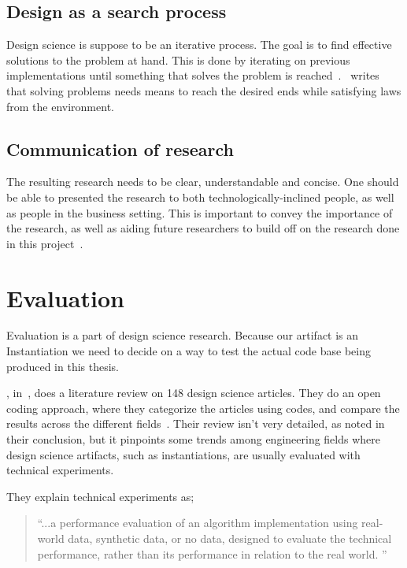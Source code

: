 \documentclass[../Main/thesis.tex]{subfiles}
\begin{document}
\subsection*{Design as a search process}%
\label{sub:design_as_a_search_process}
Design science is suppose to be an iterative process. The goal is to find
effective solutions to the problem at hand. This is done by iterating on
previous implementations until something that solves the problem is
reached~\cite{Hevner:2004:DSI:2017212.2017217}.~\citeauthor{Hevner:2004:DSI:2017212.2017217}
writes that solving problems needs means to reach the desired ends while
satisfying laws from the environment.

\subsection*{Communication of research}%
\label{sub:communication_of_research}
The resulting research needs to be clear, understandable and concise. One should
be able to presented the research to both technologically-inclined people, as
well as people in the business setting. This is important to convey the
importance of the research, as well as aiding future researchers to build off on
the research done in this project~\cite{Hevner:2004:DSI:2017212.2017217}.


\section{Evaluation}%
\label{sec:methodology_evaluation}
Evaluation is a part of design science research. Because our artifact is an
Instantiation we need to decide on a way to test the actual code base being
produced in this thesis.

\citeauthor{Peffers:2012:DSR:2342209.2342243},
in~, does a literature review on 148
design science articles. They do an open coding approach, where they categorize
the articles using codes, and compare the results across the different
fields~\cite{Peffers:2012:DSR:2342209.2342243}. Their review isn't very
detailed, as noted in their conclusion, but it pinpoints some trends among
engineering fields where design science artifacts, such as instantiations,
are usually evaluated with technical experiments.

They explain technical experiments as;
\begin{quotation}
    ``...a performance evaluation of an algorithm implementation using real-world
    data, synthetic data, or no data, designed to evaluate the technical
    performance, rather than its performance in relation to the real world.
    ''~\cite[p.~402]{Peffers:2012:DSR:2342209.2342243}
\end{quotation}
\end{document}
